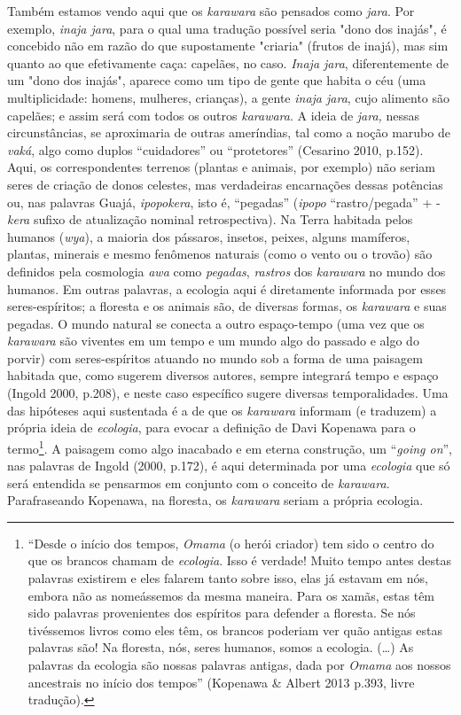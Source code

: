 Também estamos vendo aqui que os \emph{karawara} são pensados como
\emph{jara}. Por exemplo, \emph{inaja jara}, para o qual uma tradução
possível seria "dono dos inajás", é concebido não em razão do que
supostamente "criaria" (frutos de inajá), mas sim quanto ao que
efetivamente caça: capelães, no caso. \emph{Inaja jara}, diferentemente
de um "dono dos inajás", aparece como um tipo de gente que habita o céu
(uma multiplicidade: homens, mulheres, crianças), a gente \emph{inaja
jara}, cujo alimento são capelães; e assim será com todos os outros
\emph{karawara}. A ideia de \emph{jara,} nessas circunstâncias, se
aproximaria de outras ameríndias, tal como a noção marubo de
\emph{vaká}, algo como duplos ``cuidadores'' ou ``protetores'' (Cesarino
2010, p.152). Aqui, os correspondentes terrenos (plantas e animais, por
exemplo) não seriam seres de criação de donos celestes, mas verdadeiras
encarnações dessas potências ou, nas palavras Guajá, \emph{ipopokera},
isto é, ``pegadas'' (\emph{ipopo} ``rastro/pegada'' + -\emph{kera}
sufixo de atualização nominal retrospectiva). Na Terra habitada pelos
humanos (\emph{wya}), a maioria dos pássaros, insetos, peixes, alguns
mamíferos, plantas, minerais e mesmo fenômenos naturais (como o vento ou
o trovão) são definidos pela cosmologia \emph{awa} como \emph{pegadas},
\emph{rastros} dos \emph{karawara} no mundo dos humanos. Em outras
palavras, a ecologia aqui é diretamente informada por esses
seres-espíritos; a floresta e os animais são, de diversas formas, os
\emph{karawara} e suas pegadas. O mundo natural se conecta a outro
espaço-tempo (uma vez que os \emph{karawara} são viventes em um tempo e
um mundo algo do passado e algo do porvir) com seres-espíritos atuando
no mundo sob a forma de uma paisagem habitada que, como sugerem diversos
autores, sempre integrará tempo e espaço (Ingold 2000, p.208), e neste
caso específico sugere diversas temporalidades. Uma das hipóteses aqui
sustentada é a de que os \emph{karawara} informam (e traduzem) a própria
ideia de \emph{ecologia}, para evocar a definição de Davi Kopenawa para
o termo\footnote{``Desde o início dos tempos, \emph{Omama} (o herói
  criador) tem sido o centro do que os brancos chamam de
  \emph{ecologia}. Isso é verdade! Muito tempo antes destas palavras
  existirem e eles falarem tanto sobre isso, elas já estavam em nós,
  embora não as nomeássemos da mesma maneira. Para os xamãs, estas têm
  sido palavras provenientes dos espíritos para defender a floresta. Se
  nós tivéssemos livros como eles têm, os brancos poderiam ver quão
  antigas estas palavras são! Na floresta, nós, seres humanos, somos a
  ecologia. (\ldots{}) As palavras da ecologia são nossas palavras antigas,
  dada por \emph{Omama} aos nossos ancestrais no início dos tempos''
  (Kopenawa \& Albert 2013 p.393, livre tradução).}. A paisagem como
algo inacabado e em eterna construção, um ``\emph{going on}'', nas
palavras de Ingold (2000, p.172), é aqui determinada por uma
\emph{ecologia} que só será entendida se pensarmos em conjunto com o
conceito de \emph{karawara}. Parafraseando Kopenawa, na floresta, os
\emph{karawara} seriam a própria ecologia.

